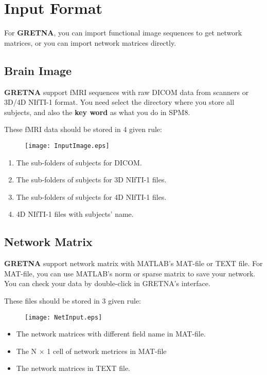 \documentclass[11pt]{article}
\begin{document}
	\section{Input Format}
		For \textbf{GRETNA}, you can import functional image sequences to get network matrices, 
		or you can import network matrices directly. 
		\subsection{Brain Image}
			\textbf{GRETNA} support fMRI sequences with raw DICOM data from scanners or 3D/4D NIfTI-1 format.
			You need select the directory where you store all subjects, 
			and also the \textbf{key word} as what you do in SPM8.

			These fMRI data should be stored in 4 given rule:
			\begin{figure}
				\begin{center}
					\texttt{[image: InputImage.eps]}
				\end{center}
			\end{figure}
			\begin{enumerate}
				\item The sub-folders of subjects for DICOM.
				\item The sub-folders of subjects for 3D NIfTI-1 files.
				\item The sub-folders of subjects for 4D NIfTI-1 files.
				\item 4D NIfTI-1 files with subjects' name.
			\end{enumerate}		
		\subsection{Network Matrix}
			\textbf{GRETNA} support network matrix with MATLAB's MAT-file or TEXT file.
			For MAT-file, you can use MATLAB's norm or sparse matrix to save your network.
			You can check your data by double-click in GRETNA's interface.

			These files should be stored in 3 given rule:
			\begin{figure}
				\begin{center}
					\texttt{[image: NetInput.eps]}
				\end{center}
			\end{figure}
			\begin{itemize}
				\item The network matrices with different field name in MAT-file.
				\item The N $\times$ 1 cell of network metrices in MAT-file
				\item The network matrices in TEXT file.
			\end{itemize}		
\end{document}
